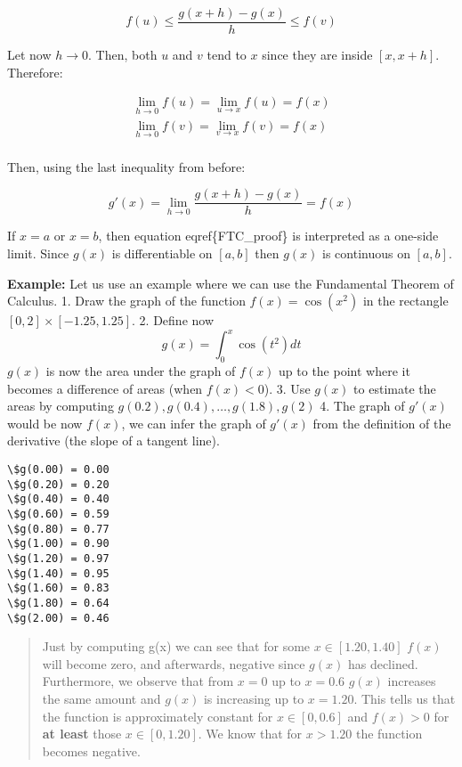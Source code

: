 \documentclass[11pt]{article}
\begin{document}
\[
f(u) \leq \frac{g(x+h)-g(x)}{h} \leq f(v)
\]

Let now \(h\rightarrow 0\). Then, both \(u\) and \(v\) tend to \(x\)
since they are inside \([x,x+h]\). Therefore:

\begin{align}
\lim_{h\rightarrow 0} f(u) = \lim_{u\rightarrow x} f(u) = f(x) \\
\lim_{h\rightarrow 0} f(v) = \lim_{v\rightarrow x} f(v) = f(x) \\
\end{align}

Then, using the last inequality from before:

\begin{equation}
g'(x) = \lim_{h\rightarrow 0} \frac{g(x+h)-g(x)}{h} = f(x)
\end{equation}

If \(x = a\) or \(x = b\), then equation eqref\{FTC\_proof\} is
interpreted as a one-side limit. Since \(g(x)\) is differentiable on
\([a,b]\) then \(g(x)\) is continuous on \([a,b]\).

    \textbf{Example:} Let us use an example where we can use the Fundamental
Theorem of Calculus. 1. Draw the graph of the function
\(f(x) = \cos(x^2)\) in the rectangle \([0, 2]\times[-1.25, 1.25]\). 2.
Define now \[
g(x) = \int^x_0 \cos(t^2) dt
\] \(g(x)\) is now the area under the graph of \(f(x)\) up to the point
where it becomes a difference of areas (when \(f(x)<0\)). 3. Use
\(g(x)\) to estimate the areas by computing
\(g(0.2), g(0.4),\ldots,g(1.8),g(2)\) 4. The graph of \(g'(x)\) would be
now \(f(x)\), we can infer the graph of \(g'(x)\) from the definition of
the derivative (the slope of a tangent line).

    \begin{Verbatim}[commandchars=\\\{\}]
\$g(0.00) = 0.00
\$g(0.20) = 0.20
\$g(0.40) = 0.40
\$g(0.60) = 0.59
\$g(0.80) = 0.77
\$g(1.00) = 0.90
\$g(1.20) = 0.97
\$g(1.40) = 0.95
\$g(1.60) = 0.83
\$g(1.80) = 0.64
\$g(2.00) = 0.46
\end{Verbatim}

    \begin{quote}
Just by computing g(x) we can see that for some \(x\in[1.20, 1.40]\)
\(f(x)\) will become zero, and afterwards, negative since \(g(x)\) has
declined. Furthermore, we observe that from \(x = 0\) up to \(x = 0.6\)
\(g(x)\) increases the same amount and \(g(x)\) is increasing up to
\(x = 1.20\). This tells us that the function is approximately constant
for \(x\in[0,0.6]\) and \(f(x) > 0\) for \textbf{at least} those
\(x\in[0, 1.20]\). We know that for \(x > 1.20\) the function becomes
negative.
\end{quote}
\end{document}
